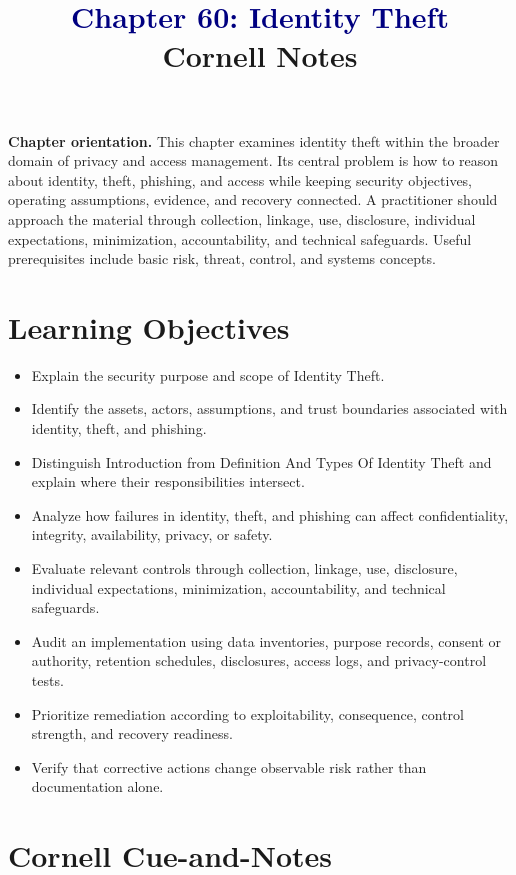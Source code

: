 \documentclass[11pt]{article}
\title{\textcolor{Navy}{Chapter 60: Identity Theft}\\[2mm]\large Cornell Notes}
\author{}
\date{}
\begin{document}
\maketitle
\thispagestyle{fancy}
\vspace{-1.5em}
\begin{orientationbox}
\textbf{Chapter orientation.} This chapter examines identity theft within the broader domain of privacy and access management. Its central problem is how to reason about identity, theft, phishing, and access while keeping security objectives, operating assumptions, evidence, and recovery connected. A practitioner should approach the material through collection, linkage, use, disclosure, individual expectations, minimization, accountability, and technical safeguards. Useful prerequisites include basic risk, threat, control, and systems concepts.
\end{orientationbox}
\section*{Learning Objectives}
\begin{itemize}
\item Explain the security purpose and scope of Identity Theft.
\item Identify the assets, actors, assumptions, and trust boundaries associated with identity, theft, and phishing.
\item Distinguish Introduction from Definition And Types Of Identity Theft and explain where their responsibilities intersect.
\item Analyze how failures in identity, theft, and phishing can affect confidentiality, integrity, availability, privacy, or safety.
\item Evaluate relevant controls through collection, linkage, use, disclosure, individual expectations, minimization, accountability, and technical safeguards.
\item Audit an implementation using data inventories, purpose records, consent or authority, retention schedules, disclosures, access logs, and privacy-control tests.
\item Prioritize remediation according to exploitability, consequence, control strength, and recovery readiness.
\item Verify that corrective actions change observable risk rather than documentation alone.
\end{itemize}
\section*{Cornell Cue-and-Notes}
\end{document}
